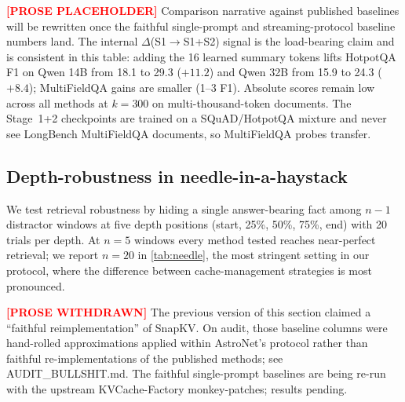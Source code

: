 \textcolor{red}{\textbf{[PROSE PLACEHOLDER]}} Comparison narrative against published baselines will be rewritten once the faithful single-prompt and streaming-protocol baseline numbers land. The internal $\Delta$(S1$\to$S1+S2) signal is the load-bearing claim and is consistent in this table: adding the 16 learned summary tokens lifts HotpotQA F1 on Qwen 14B from 18.1 to 29.3 ($+11.2$) and Qwen 32B from 15.9 to 24.3 ($+8.4$); MultiFieldQA gains are smaller (1--3 F1). Absolute scores remain low across all methods at $k{=}300$ on multi-thousand-token documents. The Stage~1+2 checkpoints are trained on a SQuAD/HotpotQA mixture and never see LongBench MultiFieldQA documents, so MultiFieldQA probes transfer.


\subsection{Depth-robustness in needle-in-a-haystack}\label{sec:needle}

We test retrieval robustness by hiding a single answer-bearing fact among $n{-}1$ distractor windows at five depth positions (start, 25\%, 50\%, 75\%, end) with 20 trials per depth. At $n{=}5$ windows every method tested reaches near-perfect retrieval; we report $n{=}20$ in \cref{tab:needle}, the most stringent setting in our protocol, where the difference between cache-management strategies is most pronounced.

\textcolor{red}{\textbf{[PROSE WITHDRAWN]}} The previous version of this section claimed a ``faithful reimplementation'' of SnapKV. On audit, those baseline columns were hand-rolled approximations applied within AstroNet's protocol rather than faithful re-implementations of the published methods; see AUDIT\_BULLSHIT.md. The faithful single-prompt baselines are being re-run with the upstream KVCache-Factory monkey-patches; results pending.


